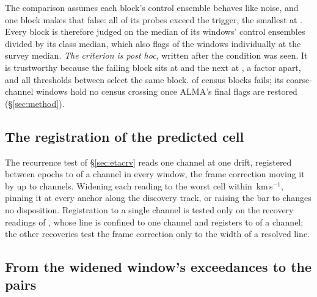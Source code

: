 The comparison assumes each block's control ensemble behaves like noise, and
one block makes that false: all \NCtrl{} of its probes exceed the trigger, the
smallest at \BqFailCtrlMin. Every block is therefore judged on the median of
its windows' control ensembles divided by its class median, which also flags
\DqNWin{} of the \NWindows{} windows individually at \BqFactor{} the survey
median. \emph{The criterion is post hoc}, written after the condition was
seen. It is trustworthy because the failing block sits at \BqFailQ{} and the
next at \BqNextQ, a factor \QsRatio{} apart, and all \QsNStep{} thresholds
between select the same block. \BqNFail{} of \BqNBlocks{} census blocks fails;
its \BqFailNWin{} coarse-channel windows hold no census crossing once ALMA's
final flags are restored (\S\ref{sec:method}).

\subsection{The registration of the predicted cell}
\label{sec:regbudget}

The recurrence test of \S\ref{sec:etacrv} reads one channel at one drift,
registered between epochs to \RgBudgetChMed{} of a channel in every window,
the frame correction moving it by up to \ZtFrameChanMax{} channels. Widening
each reading to the worst cell within \RgTolKms\,km\,s$^{-1}$, pinning it at
every anchor along the discovery track, or raising the bar to \ZtTrialThr{}
changes no disposition. Registration to a single channel is tested only on
the \RgRegNUnres{} recovery readings of \RgRegStar, whose line is confined to
one channel and registers to \RgRegMaxCh{} of a channel; the other recoveries
test the frame correction only to the width of a resolved line.

\subsection{From the widened window's exceedances to the pairs}
\label{sec:pairacct}

